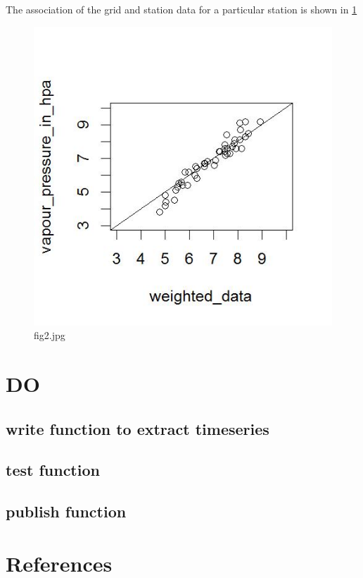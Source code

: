 \documentclass[a4paper]{article}
\begin{document}
The association of the grid and station data for a particular station is shown in \ref{fig:fig2.jpg}
\begin{figure}[!h]
\centering
\includegraphics[width=\textwidth]{fig2.jpg}
\caption{fig2.jpg}
\label{fig:fig2.jpg}
\end{figure}
\clearpage
\section{DO}
\label{sec-8}
\subsection{write function to extract timeseries}
\label{sec-8-1}
\subsection{test function}
\label{sec-8-2}
\subsection{publish function}
\label{sec-8-3}
\section{References}
\label{sec-9}



\end{document}
